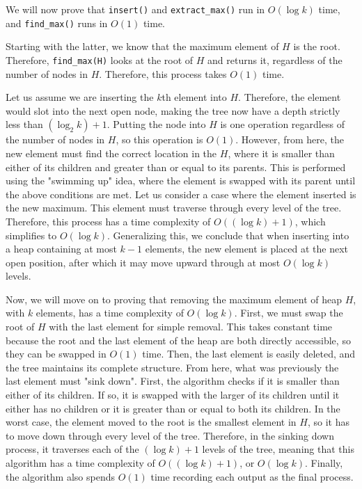 \documentclass[11pt]{article}
\begin{document}
\begin{enumerate}
We will now prove that \verb|insert()| and \verb|extract_max()| run in $O(\log k)$ time, and \verb|find_max()| runs in $O(1)$ time. 

Starting with the latter, we know that the maximum element of $H$ is the root. Therefore, \verb|find_max(H)| looks at the root of $H$ 
and returns it, regardless of the number of nodes in $H$. Therefore, this process takes $O(1)$ time.

Let us assume we are inserting the $k$th element into $H$. Therefore, the element would slot into the next open node, 
making the tree now have a depth strictly less than $(\log_2 k) + 1$. Putting the node into $H$ is one operation regardless of the number of nodes in $H$, 
so this operation is $O(1)$. However, from here, the new element must find the correct location in the $H$, 
where it is smaller than either of its children and greater than or equal to its parents. This is performed using the "swimming up" idea, 
where the element is swapped with its parent until the above conditions are met. 
Let us consider a case where the element inserted is the new maximum. This element must traverse through every level of the tree. 
Therefore, this process has a time complexity of $O((\log k) + 1)$, which simplifies to $O(\log k)$. 
Generalizing this, we conclude that when inserting into a heap containing at most $k-1$ elements, the new element is placed at the next open position, 
after which it may move upward through at most $O(\log k)$ levels.

Now, we will move on to proving that removing the maximum element of heap $H$, with $k$ elements, has a time complexity of $O(\log k)$. 
First, we must swap the root of $H$ with the last element for simple removal. This takes constant time because 
the root and the last element of the heap are both directly accessible, so they can be swapped in $O(1)$ time. 
Then, the last element is easily deleted, and the tree maintains its complete structure. 
From here, what was previously the last element must "sink down". First, the algorithm checks if it is smaller than either of its children. 
If so, it is swapped with the larger of its children until it either has no children or it is greater than or equal to both its children. 
In the worst case, the element moved to the root is the smallest element in $H$, so it has to move down through every level of the tree.
Therefore, in the sinking down process, it traverses each of the $(\log k) + 1$ levels of the tree, 
meaning that this algorithm has a time complexity of $O((\log k) + 1)$, or $O(\log k)$. 
Finally, the algorithm also spends $O(1)$ time recording each output as the final process. 


\end{enumerate}
\end{document}
